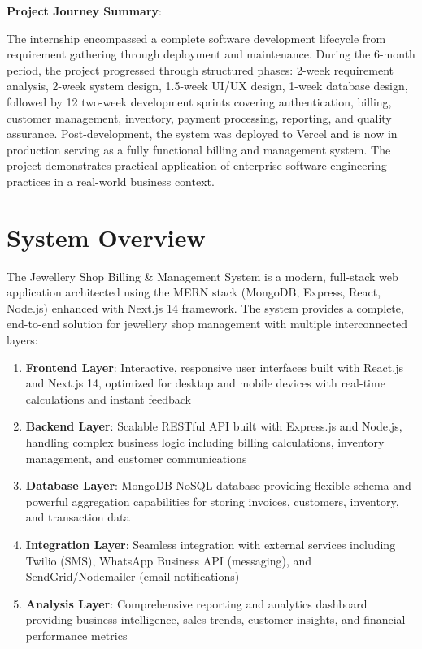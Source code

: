 \documentclass[12pt,a4paper]{report}
\begin{document}
\textbf{Project Journey Summary}:

The internship encompassed a complete software development lifecycle from requirement gathering through deployment and maintenance. During the 6-month period, the project progressed through structured phases: 2-week requirement analysis, 2-week system design, 1.5-week UI/UX design, 1-week database design, followed by 12 two-week development sprints covering authentication, billing, customer management, inventory, payment processing, reporting, and quality assurance. Post-development, the system was deployed to Vercel and is now in production serving as a fully functional billing and management system. The project demonstrates practical application of enterprise software engineering practices in a real-world business context.

\section{System Overview}

The Jewellery Shop Billing \& Management System is a modern, full-stack web application architected using the MERN stack (MongoDB, Express, React, Node.js) enhanced with Next.js 14 framework. The system provides a complete, end-to-end solution for jewellery shop management with multiple interconnected layers:

\begin{enumerate}[label=\roman*)]
    \item \textbf{Frontend Layer}: Interactive, responsive user interfaces built with React.js and Next.js 14, optimized for desktop and mobile devices with real-time calculations and instant feedback
    \item \textbf{Backend Layer}: Scalable RESTful API built with Express.js and Node.js, handling complex business logic including billing calculations, inventory management, and customer communications
    \item \textbf{Database Layer}: MongoDB NoSQL database providing flexible schema and powerful aggregation capabilities for storing invoices, customers, inventory, and transaction data
    \item \textbf{Integration Layer}: Seamless integration with external services including Twilio (SMS), WhatsApp Business API (messaging), and SendGrid/Nodemailer (email notifications)
    \item \textbf{Analysis Layer}: Comprehensive reporting and analytics dashboard providing business intelligence, sales trends, customer insights, and financial performance metrics
\end{enumerate}
\end{document}
